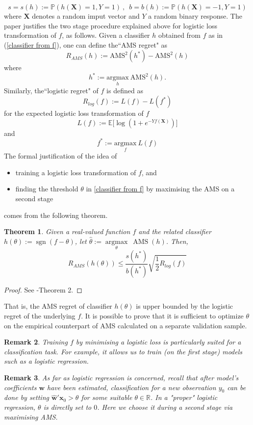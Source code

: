 \documentclass[]{article}
\newtheorem{theorem}{Theorem}[section]
\newtheorem{remark}[theorem]{Remark}
\begin{document}
$$s=s(h):=\mathbb{P}(h(\bm{X})=1,Y=1) \ \text{,} \ \ \ b=b(h):=\mathbb{P}(h(\bm{X})=-1,Y=1)$$
where $\bm{X}$ denotes a random imput vector and $Y$ a random binary response. The paper justifies the two stage procedure explained above for logistic loss transformation of $f$, as follows. Given a classifier $h$ obtained from $f$ as in (\ref{classifier from f}), one can define the``AMS regret" as
\begin{equation}
\label{regret}
R_{AMS}(h):= \text{AMS}^2(h^*)-\text{AMS}^2(h)
\end{equation}
where $$h^*:=\underset{h}{\text{argmax}} \ \text{AMS}^2(h).$$
Similarly, the``logistic regret" of $f$ is defined as
\begin{equation}
\label{logistic regret}
R_{log}(f):= L(f)-L(f^*)
\end{equation}
for the expected logistic loss transformation of $f$ $$L(f):=\mathbb{E}\Big[\log(1+e^{-Yf(\bm{X})})\Big]$$ and $$f^*:=\underset{f}{\text{argmax}} \ L(f)$$
The formal justification of the idea of 
\begin{itemize}
\item training a logistic loss transformation of $f$, and
\item finding the threshold $\theta$ in \ref{classifier from f} by maximising the AMS on a second stage
\end{itemize}
comes from the following theorem.

\begin{theorem}
\label{thm: two stage maximisation}
Given a real-valued function $f$ and the related classifier $h(\theta):=\operatorname{sgn}(f-\theta)$,  let $\hat{\theta}:=\underset{\theta}{\operatorname{argmax}} \ \operatorname{AMS}(h)$. Then,
\begin{equation}
\label{regret inequality}
R_{AMS}(h(\theta))\leq \frac{s(h^*)}{b(h^*)}\sqrt{\frac{1}{2}R_{log}(f)}
\end{equation}

\end{theorem}
\begin{proof}
 See \cite{kotlowski2014consistent}-Theorem 2.
\end{proof}

That is, the AMS regret of classifier $h(\theta)$ is upper bounded by the logistic regret of the underlying $f$. It is possible to prove that it is sufficient to optimize $\theta$ on the empirical counterpart of AMS calculated on a separate validation sample. 


\begin{remark}
Training $f$ by minimising a logistic loss is particularly suited for a classification task. For example, it allows us to train (on the first stage) models such as a logistic regression. 
\end{remark}
\begin{remark}
As far as logistic regression is concerned, recall that after model's coefficients $\bm{w}$ have been estimated, classification for a new observation $y_0$ can be done by setting  $\hat{\bm{w}}'\bm{x}_0>\theta$ for some suitable $\theta \in \mathbb{R}$. In a "proper" logistic regression, $\theta$ is directly set to $0$. Here we choose it during a second stage via maximising AMS.
\end{remark}




\end{document}
